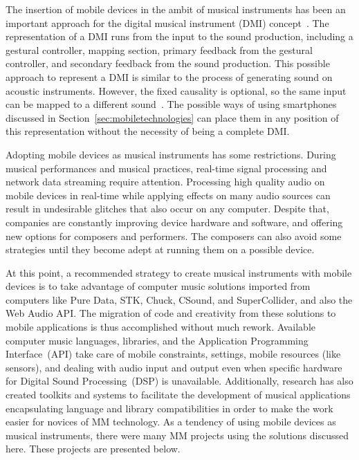 The insertion of mobile devices in the ambit of musical instruments has been an important approach for the digital musical instrument (DMI) concept~\citep{Miranda2006newdigitalmusical}.
The representation of a DMI runs from the input to the sound production, including a gestural controller, mapping section, primary feedback from the gestural controller, and secondary feedback from the sound production.
This possible approach to represent a DMI is similar to the process of generating sound on acoustic instruments.
However, the fixed causality is optional, so the same input can be mapped to a different sound~\citep{Miranda2006newdigitalmusical}.
The possible ways of using smartphones discussed in Section~\ref{sec:mobiletechnologies} can place them in any position of this representation without the necessity of being a complete DMI.

Adopting mobile devices as musical instruments has some restrictions.
During musical performances and musical practices, real-time signal processing and network data streaming require attention.
Processing high quality audio on mobile devices in real-time while applying effects on many audio sources can result in undesirable glitches that also occur on any computer.
Despite that, companies are constantly improving device hardware and software, and offering new options for composers and performers.
The composers can also avoid some strategies until they become adept at running them on a possible device.

At this point, a recommended strategy to create musical instruments with mobile devices is to take advantage of computer music solutions imported from computers like Pure Data, STK, Chuck, CSound, and SuperCollider, and also the Web Audio API.
The migration of code and creativity from these solutions to mobile applications is thus accomplished without much rework.
Available computer music languages, libraries, and the Application Programming Interface~(API) take care of mobile constraints, settings, mobile resources (like sensors), and dealing with audio input and output even when specific  hardware for Digital Sound Processing~(DSP) is unavailable.
Additionally, research has also created toolkits and systems to facilitate the development of musical applications encapsulating language and library compatibilities in order to make the work easier for novices of MM technology.
As a tendency of using mobile devices as musical instruments, there were many MM projects using the solutions discussed  here.
These projects are presented below.

